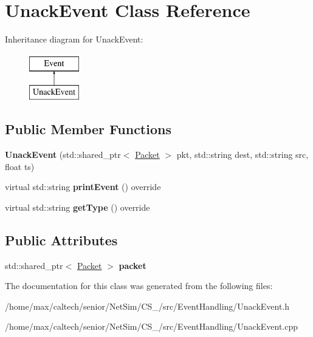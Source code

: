 \hypertarget{classUnackEvent}{\section{\-Unack\-Event \-Class \-Reference}
\label{classUnackEvent}
}
\-Inheritance diagram for \-Unack\-Event\-:\begin{figure}[H]
\begin{center}
\leavevmode
\includegraphics[height=2.000000cm]{classUnackEvent}
\end{center}
\end{figure}
\subsection*{\-Public \-Member \-Functions}
\begin{DoxyCompactItemize}
\item 
\hypertarget{classUnackEvent_abd9be091010bf06561b3b775e914b094}{{\bfseries \-Unack\-Event} (std\-::shared\-\_\-ptr$<$ \hyperlink{classPacket}{\-Packet} $>$ pkt, std\-::string dest, std\-::string src, float ts)}\label{classUnackEvent_abd9be091010bf06561b3b775e914b094}

\item 
\hypertarget{classUnackEvent_a7bc2907c2c7454c761acd654e9b64ca8}{virtual std\-::string {\bfseries print\-Event} () override}\label{classUnackEvent_a7bc2907c2c7454c761acd654e9b64ca8}

\item 
\hypertarget{classUnackEvent_a56ca06731117d1fff95a1601abed02e8}{virtual std\-::string {\bfseries get\-Type} () override}\label{classUnackEvent_a56ca06731117d1fff95a1601abed02e8}

\end{DoxyCompactItemize}
\subsection*{\-Public \-Attributes}
\begin{DoxyCompactItemize}
\item 
\hypertarget{classUnackEvent_ad9d09191d5ee31c15c554e797a708f7d}{std\-::shared\-\_\-ptr$<$ \hyperlink{classPacket}{\-Packet} $>$ {\bfseries packet}}\label{classUnackEvent_ad9d09191d5ee31c15c554e797a708f7d}

\end{DoxyCompactItemize}


\-The documentation for this class was generated from the following files\-:\begin{DoxyCompactItemize}
\item 
/home/max/caltech/senior/\-Net\-Sim/\-C\-S\-\_/src/\-Event\-Handling/\-Unack\-Event.\-h\item 
/home/max/caltech/senior/\-Net\-Sim/\-C\-S\-\_/src/\-Event\-Handling/\-Unack\-Event.\-cpp\end{DoxyCompactItemize}
